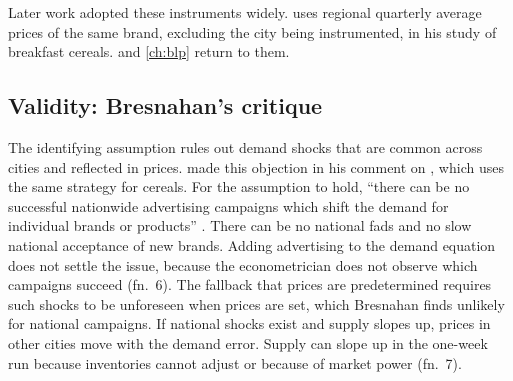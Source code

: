 Later work adopted these instruments widely. \citet{Nevo2001} uses regional quarterly average prices of the same
brand, excluding the city being instrumented, in his study of breakfast cereals.  and
\cref{ch:blp} return to them.

\subsection{Validity: Bresnahan's critique}\label{sec:05-bresnahan-critique}

The identifying assumption rules out demand shocks that are common across cities and reflected in prices.
\citet{Bresnahan1997} made this objection in his comment on \citet{Hausman1997}, which uses the same strategy for
cereals. For the assumption to hold, ``there can be no successful nationwide advertising campaigns which shift
the demand for individual brands or products'' \citep[p.~241]{Bresnahan1997}. There can be no national fads and
no slow national acceptance of new brands. Adding advertising to the demand equation does not settle the issue,
because the econometrician does not observe which campaigns succeed (fn.~6). The fallback that prices are
predetermined requires such shocks to be unforeseen when prices are set, which Bresnahan finds unlikely for
national campaigns. If national shocks exist and supply slopes up, prices in other cities move with the demand
error. Supply can slope up in the one-week run because inventories cannot adjust or because of market power
(fn.~7).

